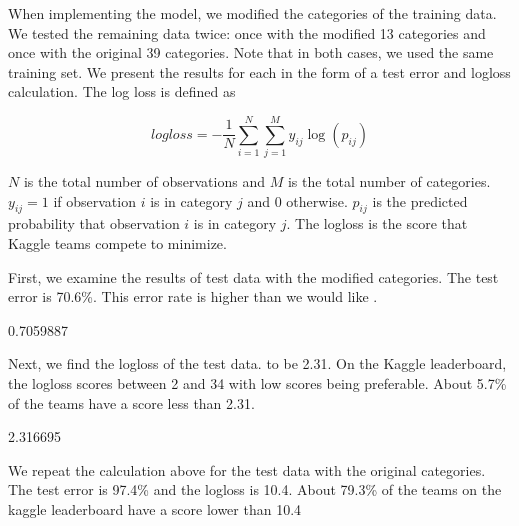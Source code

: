 \documentclass[11pt]{article}
\begin{document}
When implementing the model, we modified the categories of the training data. We tested the remaining data twice: once with the modified 13 categories and once with the original 39 categories. Note that in both cases, we used the same training set.  We present the results for each in the form of a test error and logloss calculation. The log loss is defined as 

\[ logloss = - \frac{1}{N} \sum_{i=1}^N \sum_{j=1}^M y_{ij} \log (p_{ij}) \]

$N$ is the total number of observations and $M$ is the total number of categories. $y_{ij} = 1$ if  observation $i$ is in category $j$ and 0 otherwise. $p_{ij}$ is the predicted probability that observation $i$ is in category $j$. The logloss is the score that Kaggle teams compete to minimize.

First, we examine the results of test data with the modified categories. The test error is 70.6\%. This error rate is higher than we would like .


\begin{Schunk}
\begin{Soutput}
[1] 0.7059887
\end{Soutput}
\end{Schunk}

Next, we find the logloss of the test  data. to be 2.31. On the  Kaggle  leaderboard, the logloss scores between 2 and 34 with low scores being preferable. About 5.7\% of the teams have a score less than 2.31. 

\begin{Schunk}
\begin{Soutput}
[1] 2.316695
\end{Soutput}
\end{Schunk}

We repeat the calculation above for the test data with the original categories. The test error is 97.4\% and the logloss is 10.4. About 79.3\% of the teams on the kaggle leaderboard have a score lower than 10.4
\end{document}
